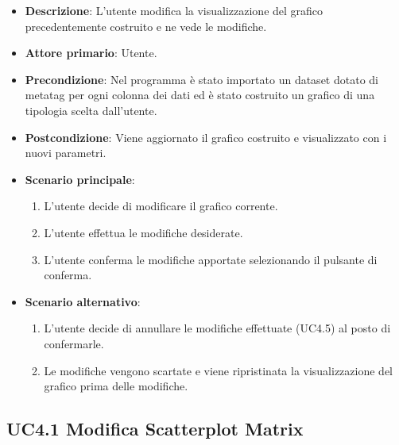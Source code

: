 \begin{itemize}
    \item \textbf{Descrizione}: L’utente modifica la visualizzazione del grafico precedentemente costruito
                                e ne vede le modifiche.
	
    \item \textbf{Attore primario}: Utente.
    
    \item \textbf{Precondizione}:   Nel programma è stato importato un dataset dotato di metatag per ogni
                                    colonna dei dati ed è stato costruito un grafico di una tipologia scelta dall'utente.

    \item \textbf{Postcondizione}:  Viene aggiornato il grafico costruito e visualizzato con i nuovi parametri.

	\item \textbf{Scenario principale}:
		\begin{enumerate}
			\item L'utente decide di modificare il grafico corrente.
			\item L'utente effettua le modifiche desiderate.
            \item L'utente conferma le modifiche apportate selezionando il pulsante di conferma.
        \end{enumerate}

    \item \textbf{Scenario alternativo}:
        \begin{enumerate}
            \item L'utente decide di annullare le modifiche effettuate (UC4.5) al posto di confermarle.   
            \item Le modifiche vengono scartate e viene ripristinata la visualizzazione del grafico prima delle modifiche.
        \end{enumerate}
    
\end{itemize}


\subsection{UC4.1 Modifica Scatterplot Matrix}
\label{subsec:uc4.1}

